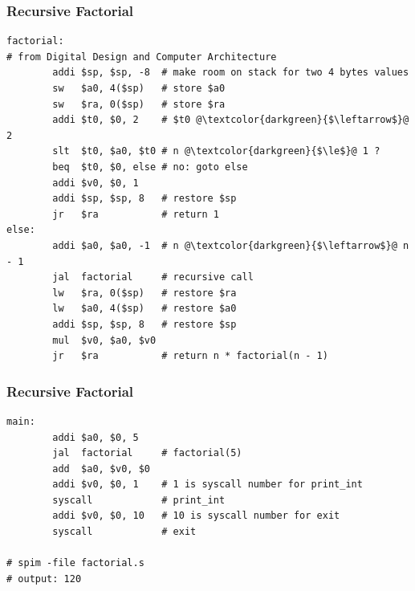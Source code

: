\documentclass{beamer}
\newcounter{exo}
\newcommand{\exo}{
  \addtocounter{exo}{1}
  Exercice \arabic{exo}
}
\begin{document}
\begin{frame}[fragile]
\frametitle{Recursive Factorial}

\scriptsize

\begin{lstlisting}
factorial:
# from Digital Design and Computer Architecture
        addi $sp, $sp, -8  # make room on stack for two 4 bytes values
        sw   $a0, 4($sp)   # store $a0
        sw   $ra, 0($sp)   # store $ra
        addi $t0, $0, 2    # $t0 @\textcolor{darkgreen}{$\leftarrow$}@ 2
        slt  $t0, $a0, $t0 # n @\textcolor{darkgreen}{$\le$}@ 1 ?
        beq  $t0, $0, else # no: goto else
        addi $v0, $0, 1
        addi $sp, $sp, 8   # restore $sp
        jr   $ra           # return 1
else:
        addi $a0, $a0, -1  # n @\textcolor{darkgreen}{$\leftarrow$}@ n - 1
        jal  factorial     # recursive call
        lw   $ra, 0($sp)   # restore $ra
        lw   $a0, 4($sp)   # restore $a0
        addi $sp, $sp, 8   # restore $sp
        mul  $v0, $a0, $v0
        jr   $ra           # return n * factorial(n - 1)
\end{lstlisting}


\end{frame}

\begin{frame}[fragile]
\frametitle{Recursive Factorial}

\scriptsize

\begin{lstlisting}
main:
        addi $a0, $0, 5
        jal  factorial     # factorial(5)
        add  $a0, $v0, $0
        addi $v0, $0, 1    # 1 is syscall number for print_int
        syscall            # print_int
        addi $v0, $0, 10   # 10 is syscall number for exit
        syscall            # exit

# spim -file factorial.s
# output: 120
\end{lstlisting}

\end{frame}

\lstset{language=C}

\end{document}
